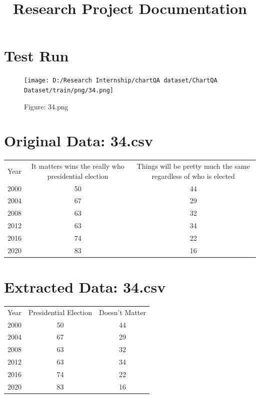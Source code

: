 \documentclass{article}
\title{Research Project Documentation}
\begin{document}
\maketitle
\section*{Test Run}
\begin{figure}[h!]
\centering
\texttt{[image: D:/Research Internship/chartQA dataset/ChartQA Dataset/train/png/34.png]}
\caption{Figure: 34.png}
\end{figure}
\section*{Original Data: 34.csv}
\begin{center}
\begin{adjustbox}{max width=\textwidth}
\begin{tabular}{c|c|c}
Year & It matters wins the really who presidential election & Things will be pretty much the same regardless of who is elected \\
2000 & 50 & 44 \\
2004 & 67 & 29 \\
2008 & 63 & 32 \\
2012 & 63 & 34 \\
2016 & 74 & 22 \\
2020 & 83 & 16 \\
\end{tabular}

\end{adjustbox}
\end{center}
\section*{Extracted Data: 34.csv}
\begin{center}
\begin{adjustbox}{max width=\textwidth}
\begin{tabular}{c|c|c}
Year & Presidential Election & Doesn't Matter \\
2000 & 50 & 44 \\
2004 & 67 & 29 \\
2008 & 63 & 32 \\
2012 & 63 & 34 \\
2016 & 74 & 22 \\
2020 & 83 & 16 \\
\end{tabular}

\end{adjustbox}
\end{center}
\end{document}
